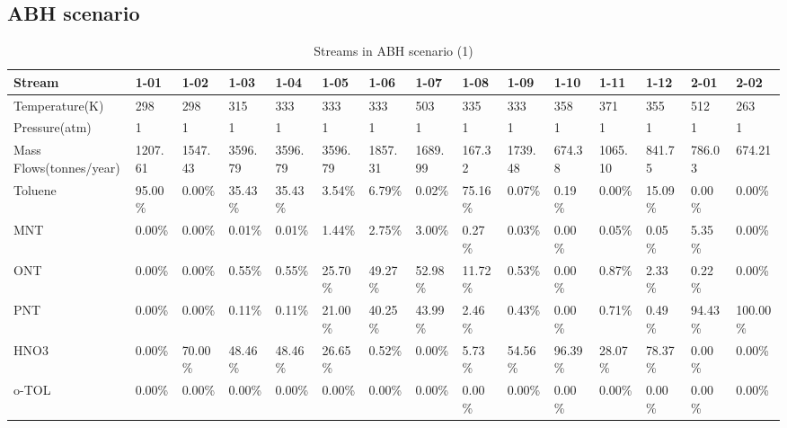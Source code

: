 \begin{landscape}
\newpage
\subsection{ABH scenario}



\begin{table}[H]
\centering
\caption{Streams in ABH scenario (1)}
\label{ABHFST1}
\begin{tabular}{|l|l|l|l|l|l|l|l|l|l|l|l|l|l|l|}
\hline
\textbf{Stream}         & 1-01    & 1-02    & 1-03    & 1-04    & 1-05    & 1-06    & 1-07    & 1-08    & 1-09    & 1-10    & 1-11    & 1-12    & 2-01    & 2-02     \\ \hline
Temperature(K)          & 298     & 298     & 315     & 333     & 333     & 333     & 503     & 335     & 333     & 358     & 371     & 355     & 512     & 263      \\ \hline
Pressure(atm)           & 1       & 1       & 1       & 1       & 1       & 1       & 1       & 1       & 1       & 1       & 1       & 1       & 1       & 1        \\ \hline
Mass Flows(tonnes/year) & 1207.61 & 1547.43 & 3596.79 & 3596.79 & 3596.79 & 1857.31 & 1689.99 & 167.32  & 1739.48 & 674.38  & 1065.10 & 841.75  & 786.03  & 674.21   \\ \hline
Toluene                 & 95.00\% & 0.00\%  & 35.43\% & 35.43\% & 3.54\%  & 6.79\%  & 0.02\%  & 75.16\% & 0.07\%  & 0.19\%  & 0.00\%  & 15.09\% & 0.00\%  & 0.00\%   \\ \hline
MNT                     & 0.00\%  & 0.00\%  & 0.01\%  & 0.01\%  & 1.44\%  & 2.75\%  & 3.00\%  & 0.27\%  & 0.03\%  & 0.00\%  & 0.05\%  & 0.05\%  & 5.35\%  & 0.00\%   \\ \hline
ONT                     & 0.00\%  & 0.00\%  & 0.55\%  & 0.55\%  & 25.70\% & 49.27\% & 52.98\% & 11.72\% & 0.53\%  & 0.00\%  & 0.87\%  & 2.33\%  & 0.22\%  & 0.00\%   \\ \hline
PNT                     & 0.00\%  & 0.00\%  & 0.11\%  & 0.11\%  & 21.00\% & 40.25\% & 43.99\% & 2.46\%  & 0.43\%  & 0.00\%  & 0.71\%  & 0.49\%  & 94.43\% & 100.00\% \\ \hline
HNO3                    & 0.00\%  & 70.00\% & 48.46\% & 48.46\% & 26.65\% & 0.52\%  & 0.00\%  & 5.73\%  & 54.56\% & 96.39\% & 28.07\% & 78.37\% & 0.00\%  & 0.00\%   \\ \hline
o-TOL                   & 0.00\%  & 0.00\%  & 0.00\%  & 0.00\%  & 0.00\%  & 0.00\%  & 0.00\%  & 0.00\%  & 0.00\%  & 0.00\%  & 0.00\%  & 0.00\%  & 0.00\%  & 0.00\%   \\ \hline

\end{tabular}
\end{table}
\end{landscape}
